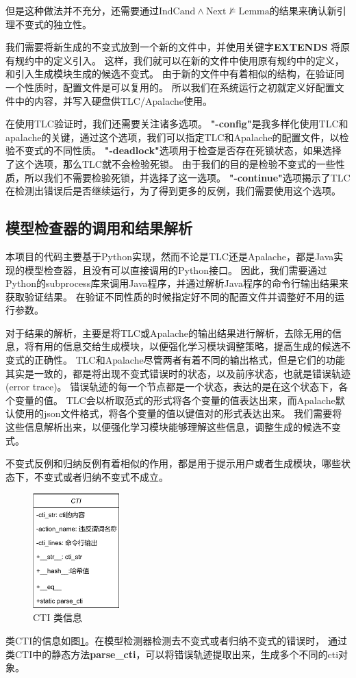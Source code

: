 但是这种做法并不充分，还需要通过$\text{IndCand} \wedge \text{Next} \nvDash \text{Lemma}$的结果来确认新引理不变式的独立性。

我们需要将新生成的不变式放到一个新的文件中，并使用关键字\textbf{EXTENDS} 将原有规约中的定义引入。
这样，我们就可以在新的文件中使用原有规约中的定义，和引入生成模块生成的候选不变式。
由于新的\TLA 文件中有着相似的结构，在验证同一个性质时，配置文件是可以复用的。
所以我们在系统运行之初就定义好配置文件中的内容，并写入硬盘供TLC/Apalache使用。

在使用TLC验证时，我们还需要关注诸多选项。
\textbf{"-config"}是我多样化使用TLC和apalache的关键，通过这个选项，我们可以指定TLC和Apalache的配置文件，以检验不变式的不同性质。
\textbf{"-deadlock"}选项用于检查是否存在死锁状态，如果选择了这个选项，那么TLC就不会检验死锁。
由于我们的目的是检验不变式的一些性质，所以我们不需要检验死锁，并选择了这一选项。
\textbf{"-continue"}选项揭示了TLC在检测出错误后是否继续运行，为了得到更多的反例，我们需要使用这个选项。

\subsection{模型检查器的调用和结果解析}
本项目的代码主要基于Python实现，然而不论是TLC还是Apalache，都是Java实现的模型检查器，且没有可以直接调用的Python接口。
因此，我们需要通过Python的subprocess库来调用Java程序，并通过解析Java程序的命令行输出结果来获取验证结果。
在验证不同性质的时候指定好不同的配置文件并调整好不用的运行参数。

对于结果的解析，主要是将TLC或Apalache的输出结果进行解析，去除无用的信息，将有用的信息交给生成模块，以便强化学习模块调整策略，提高生成的候选不变式的正确性。
TLC和Apalache尽管两者有着不同的输出格式，但是它们的功能其实是一致的，都是将出现不变式错误时的状态，以及前序状态，也就是错误轨迹(error trace)。
错误轨迹的每一个节点都是一个状态，表达的是在这个状态下，各个变量的值。
TLC会以析取范式的形式将各个变量的值表达出来，而Apalache默认使用的json文件格式，将各个变量的值以键值对的形式表达出来。
我们需要将这些信息解析出来，以便强化学习模块能够理解这些信息，调整生成的候选不变式。

不变式反例和归纳反例有着相似的作用，都是用于提示用户或者生成模块，哪些状态下，不变式或者归纳不变式不成立。

\begin{figure}[htb]
	\centering
	\includegraphics[width=0.3\textwidth]{figures/class_cti.pdf}
	\caption{CTI 类信息}
	\label{fig:class_cti}
\end{figure}
类CTI的信息如图\ref{fig:class_cti}。在模型检测器检测去不变式或者归纳不变式的错误时，
通过类CTI中的静态方法\textbf{parse\_cti}，可以将错误轨迹提取出来，生成多个不同的cti对象。

